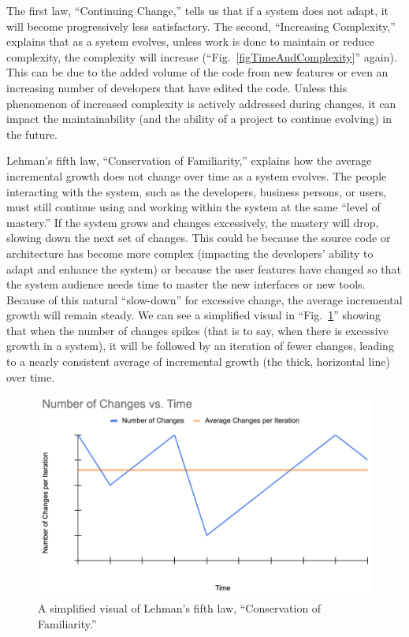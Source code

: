 \documentclass[12pt,conference]{IEEEtran}
\begin{document}
\vspace{0.25cm}

The first law, ``Continuing Change,'' tells us that if a system does not adapt, it will become progressively less satisfactory. The second, ``Increasing Complexity,'' explains that as a system evolves, unless work is done to maintain or reduce complexity, the complexity will increase (``Fig.~\ref{figTimeAndComplexity}'' again). This can be due to the added volume of the code from new features or even an increasing number of developers that have edited the code. Unless this phenomenon of increased complexity is actively addressed during changes, it can impact the maintainability (and the ability of a project to continue evolving) in the future.

Lehman's fifth law, ``Conservation of Familiarity,'' explains how the average incremental growth does not change over time as a system evolves. The people interacting with the system, such as the developers, business persons, or users, must still continue using and working within the system at the same ``level of mastery.'' If the system grows and changes excessively, the mastery will drop, slowing down the next set of changes. This could be because the source code or architecture has become more complex (impacting the developers' ability to adapt and enhance the system) or because the user features have changed so that the system audience needs time to master the new interfaces or new tools. Because of this natural ``slow-down'' for excessive change, the average incremental growth will remain steady. We can see a simplified visual in ``Fig.~\ref{figConservationOfFamiliarity}'' showing that when the number of changes spikes (that is to say, when there is excessive growth in a system), it will be followed by an iteration of fewer changes, leading to a nearly consistent average of incremental growth (the thick, horizontal line) over time.

\begin{figure}[ht]
    \centerline{
        \includegraphics[width=\columnwidth]{Changes-vs-Time}
    }
    \caption{A simplified visual of Lehman's fifth law, ``Conservation of Familiarity.''}
    \label{figConservationOfFamiliarity}
\end{figure}
\end{document}
